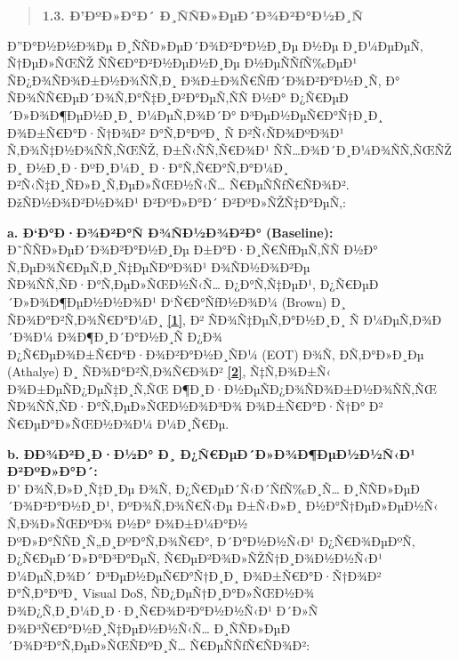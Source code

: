 \documentclass[]{article}
\begin{document}
\begin{quote}
\textbf{1.3. Ð’ÐºÐ»Ð°Ð´ Ð¸ÑÑÐ»ÐµÐ´Ð¾Ð²Ð°Ð½Ð¸Ñ}
\end{quote}

Ð”Ð°Ð½Ð½Ð¾Ðµ Ð¸ÑÑÐ»ÐµÐ´Ð¾Ð²Ð°Ð½Ð¸Ðµ Ð½Ðµ Ð¸Ð¼ÐµÐµÑ‚ Ñ†ÐµÐ»ÑŒÑŽ ÑÑ€Ð°Ð²Ð½ÐµÐ½Ð¸Ðµ Ð½ÐµÑÑƒÑ‰ÐµÐ¹ ÑÐ¿Ð¾ÑÐ¾Ð±Ð½Ð¾ÑÑ‚Ð¸ Ð¾Ð±Ð¾Ñ€ÑƒÐ´Ð¾Ð²Ð°Ð½Ð¸Ñ, Ð° ÑÐ¾ÑÑ€ÐµÐ´Ð¾Ñ‚Ð°Ñ‡Ð¸Ð²Ð°ÐµÑ‚ÑÑ Ð½Ð° Ð¿Ñ€ÐµÐ´Ð»Ð¾Ð¶ÐµÐ½Ð¸Ð¸ Ð¼ÐµÑ‚Ð¾Ð´Ð° Ð³ÐµÐ½ÐµÑ€Ð°Ñ†Ð¸Ð¸ Ð¾Ð±Ñ€Ð°Ð·Ñ†Ð¾Ð² Ð°Ñ‚Ð°ÐºÐ¸ Ñ Ð²Ñ‹ÑÐ¾ÐºÐ¾Ð¹ Ñ‚Ð¾Ñ‡Ð½Ð¾ÑÑ‚ÑŒÑŽ, Ð±Ñ‹ÑÑ‚Ñ€Ð¾Ð¹ ÑÑ…Ð¾Ð´Ð¸Ð¼Ð¾ÑÑ‚ÑŒÑŽ Ð¸ Ð½Ð¸Ð·ÐºÐ¸Ð¼Ð¸ Ð·Ð°Ñ‚Ñ€Ð°Ñ‚Ð°Ð¼Ð¸ Ð²Ñ‹Ñ‡Ð¸ÑÐ»Ð¸Ñ‚ÐµÐ»ÑŒÐ½Ñ‹Ñ… Ñ€ÐµÑÑƒÑ€ÑÐ¾Ð². ÐžÑÐ½Ð¾Ð²Ð½Ð¾Ð¹ Ð²ÐºÐ»Ð°Ð´ Ð²ÐºÐ»ÑŽÑ‡Ð°ÐµÑ‚:

\textbf{a. Ð‘Ð°Ð·Ð¾Ð²Ð°Ñ Ð¾ÑÐ½Ð¾Ð²Ð° (Baseline):}\\
Ð˜ÑÑÐ»ÐµÐ´Ð¾Ð²Ð°Ð½Ð¸Ðµ Ð±Ð°Ð·Ð¸Ñ€ÑƒÐµÑ‚ÑÑ Ð½Ð° Ñ‚ÐµÐ¾Ñ€ÐµÑ‚Ð¸Ñ‡ÐµÑÐºÐ¾Ð¹ Ð¾ÑÐ½Ð¾Ð²Ðµ ÑÐ¾ÑÑ‚ÑÐ·Ð°Ñ‚ÐµÐ»ÑŒÐ½Ñ‹Ñ… Ð¿Ð°Ñ‚Ñ‡ÐµÐ¹, Ð¿Ñ€ÐµÐ´Ð»Ð¾Ð¶ÐµÐ½Ð½Ð¾Ð¹ Ð‘Ñ€Ð°ÑƒÐ½Ð¾Ð¼ (Brown) Ð¸ ÑÐ¾Ð°Ð²Ñ‚Ð¾Ñ€Ð°Ð¼Ð¸ \hyperref[TL1]{\textbf{{[}1{]}}}, Ð² ÑÐ¾Ñ‡ÐµÑ‚Ð°Ð½Ð¸Ð¸ Ñ Ð¼ÐµÑ‚Ð¾Ð´Ð¾Ð¼ Ð¾Ð¶Ð¸Ð´Ð°Ð½Ð¸Ñ Ð¿Ð¾ Ð¿Ñ€ÐµÐ¾Ð±Ñ€Ð°Ð·Ð¾Ð²Ð°Ð½Ð¸ÑÐ¼ (EOT) Ð¾Ñ‚ ÐÑ‚Ð°Ð»Ð¸Ðµ (Athalye) Ð¸ ÑÐ¾Ð°Ð²Ñ‚Ð¾Ñ€Ð¾Ð² \hyperref[TL2]{\textbf{{[}2{]}}}, Ñ‡Ñ‚Ð¾Ð±Ñ‹ Ð¾Ð±ÐµÑÐ¿ÐµÑ‡Ð¸Ñ‚ÑŒ Ð¶Ð¸Ð·Ð½ÐµÑÐ¿Ð¾ÑÐ¾Ð±Ð½Ð¾ÑÑ‚ÑŒ ÑÐ¾ÑÑ‚ÑÐ·Ð°Ñ‚ÐµÐ»ÑŒÐ½Ð¾Ð³Ð¾ Ð¾Ð±Ñ€Ð°Ð·Ñ†Ð° Ð² Ñ€ÐµÐ°Ð»ÑŒÐ½Ð¾Ð¼ Ð¼Ð¸Ñ€Ðµ.

\textbf{b. ÐÐ¾Ð²Ð¸Ð·Ð½Ð° Ð¸ Ð¿Ñ€ÐµÐ´Ð»Ð¾Ð¶ÐµÐ½Ð½Ñ‹Ð¹ Ð²ÐºÐ»Ð°Ð´:}\\
Ð’ Ð¾Ñ‚Ð»Ð¸Ñ‡Ð¸Ðµ Ð¾Ñ‚ Ð¿Ñ€ÐµÐ´Ñ‹Ð´ÑƒÑ‰Ð¸Ñ… Ð¸ÑÑÐ»ÐµÐ´Ð¾Ð²Ð°Ð½Ð¸Ð¹, ÐºÐ¾Ñ‚Ð¾Ñ€Ñ‹Ðµ Ð±Ñ‹Ð»Ð¸ Ð½Ð°Ñ†ÐµÐ»ÐµÐ½Ñ‹ Ñ‚Ð¾Ð»ÑŒÐºÐ¾ Ð½Ð° Ð¾Ð±Ð¼Ð°Ð½ ÐºÐ»Ð°ÑÑÐ¸Ñ„Ð¸ÐºÐ°Ñ‚Ð¾Ñ€Ð°, Ð´Ð°Ð½Ð½Ñ‹Ð¹ Ð¿Ñ€Ð¾ÐµÐºÑ‚ Ð¿Ñ€ÐµÐ´Ð»Ð°Ð³Ð°ÐµÑ‚ Ñ€ÐµÐ²Ð¾Ð»ÑŽÑ†Ð¸Ð¾Ð½Ð½Ñ‹Ð¹ Ð¼ÐµÑ‚Ð¾Ð´ Ð³ÐµÐ½ÐµÑ€Ð°Ñ†Ð¸Ð¸ Ð¾Ð±Ñ€Ð°Ð·Ñ†Ð¾Ð² Ð°Ñ‚Ð°ÐºÐ¸ Visual DoS, ÑÐ¿ÐµÑ†Ð¸Ð°Ð»ÑŒÐ½Ð¾ Ð¾Ð¿Ñ‚Ð¸Ð¼Ð¸Ð·Ð¸Ñ€Ð¾Ð²Ð°Ð½Ð½Ñ‹Ð¹ Ð´Ð»Ñ Ð¾Ð³Ñ€Ð°Ð½Ð¸Ñ‡ÐµÐ½Ð½Ñ‹Ñ… Ð¸ÑÑÐ»ÐµÐ´Ð¾Ð²Ð°Ñ‚ÐµÐ»ÑŒÑÐºÐ¸Ñ… Ñ€ÐµÑÑƒÑ€ÑÐ¾Ð²:
\end{document}
